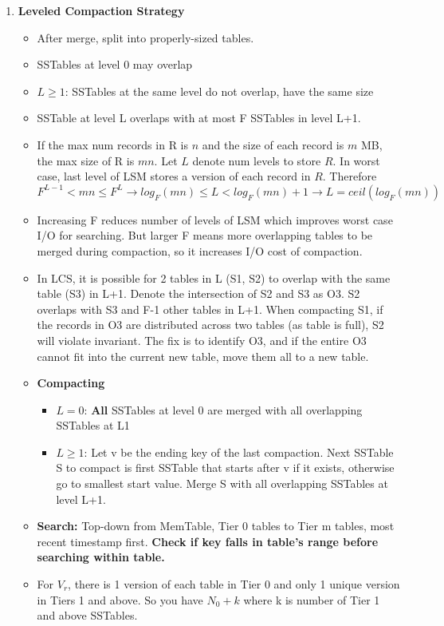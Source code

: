 \documentclass[8pt, landscape]{extarticle}
\begin{document}
\begin{multicols*}{4}
\begin{enumerate}
    \item \textbf{Leveled Compaction Strategy}
    \begin{itemize}
        \item After merge, split into properly-sized tables.
        \item SSTables at level 0 may overlap
        \item $L \geq 1$: SSTables at the same level do not overlap, have the same size
        \item SSTable at level L overlaps with at most F SSTables in level L+1.
        \item If the max num records in R is $n$ and the size of each record is $m$ MB, the max size of R is $mn$. Let $L$ denote num levels to store $R$. In worst case, last level of LSM stores a version of each record in $R$. Therefore $F^{L-1}< mn \leq F^{L} \rightarrow log_{F}(mn) \leq L < log_{F}(mn)+1 \rightarrow L = ceil(log_{F}(mn))$
        \item Increasing F reduces number of levels of LSM which improves worst case I/O for searching. But larger F means more overlapping tables to be merged during compaction, so it increases I/O cost of compaction.
        \item In LCS, it is possible for 2 tables in L (S1, S2) to overlap with the same table (S3) in L+1. Denote the intersection of S2 and S3 as O3. S2 overlaps with S3 and F-1 other tables in L+1. When compacting S1, if the records in O3 are distributed across two tables (as table is full), S2 will violate invariant. The fix is to identify O3, and if the entire O3 cannot fit into the current new table, move them all to a new table.
        \item \textbf{Compacting}
        \begin{itemize}
            \item $L=0$: \textbf{All} SSTables at level 0 are merged with all overlapping SSTables at L1
            \item $L \geq 1$: Let v be the ending key of the last compaction. Next SSTable S to compact is first SSTable that starts after v if it exists, otherwise go to smallest start value. Merge S with all overlapping SSTables at level L+1.
        \end{itemize}
        \item \textbf{Search:} Top-down from MemTable, Tier 0 tables to Tier m tables, most recent timestamp first. \textbf{Check if key falls in table's range before searching within table.}
        \item For $V_r$, there is 1 version of each table in Tier 0 and only 1 unique version in Tiers 1 and above. So you have $N_0 + k$ where k is number of Tier 1 and above SSTables.
    \end{itemize}
\end{enumerate}


\end{multicols*}
\end{document}
